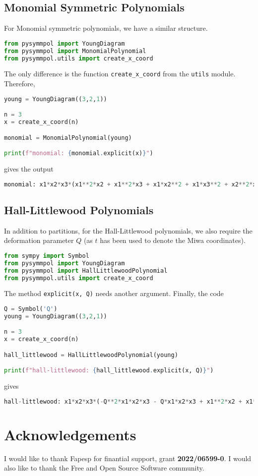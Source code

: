 \documentclass[a4paper,10pt]{amsart}
\begin{document}
\subsection{Monomial Symmetric Polynomials}

For Monomial symmetric polynomials, we have a similar structure. 
\begin{lstlisting}[language=Python]
from pysymmpol import YoungDiagram
from pysymmpol import MonomialPolynomial
from pysymmpol.utils import create_x_coord
\end{lstlisting}
The only difference is the function \verb|create_x_coord| from the
\verb|utils| module. Therefore,
\begin{lstlisting}[language=Python]
young = YoungDiagram((3,2,1))

n = 3
x = create_x_coord(n)

monomial = MonomialPolynomial(young)

print(f"monomial: {monomial.explicit(x)}")
\end{lstlisting}
gives the output 
\begin{lstlisting}[language=Python]
monomial: x1*x2*x3*(x1**2*x2 + x1**2*x3 + x1*x2**2 + x1*x3**2 + x2**2*x3 + x2*x3**2)
\end{lstlisting}

\subsection{Hall-Littlewood Polynomials}

In addition to partitions, for the Hall-Littlewood polynomials, 
we also require the deformation parameter \(Q\) (as \(t\) has been used to 
denote the Miwa coordinates).
\begin{lstlisting}[language=Python]
from sympy import Symbol
from pysymmpol import YoungDiagram
from pysymmpol import HallLittlewoodPolynomial
from pysymmpol.utils import create_x_coord
\end{lstlisting}
The method \verb|explicit(x, Q)| needs another argument. Finally, the code
\begin{lstlisting}[language=Python]
Q = Symbol('Q')
young = YoungDiagram((3,2,1))

n = 3
x = create_x_coord(n)

hall_littlewood = HallLittlewoodPolynomial(young)

print(f"hall-littlewood: {hall_littlewood.explicit(x, Q)}")
\end{lstlisting}
gives
\begin{lstlisting}[language=Python]
hall-littlewood: x1*x2*x3*(-Q**2*x1*x2*x3 - Q*x1*x2*x3 + x1**2*x2 + x1**2*x3 + x1*x2**2 + 2*x1*x2*x3 + x1*x3**2 + x2**2*x3 + x2*x3**2)
\end{lstlisting}

\section{Acknowledgements}

I would like to thank Fapesp for finantial support, grant
\textbf{2022/06599-0}.  I would also like to thank the Free and Open
Source Software community.

\printbibliography
     
\end{document}
